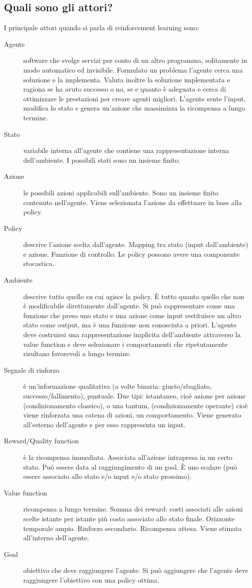 \documentclass[\main/main.tex]{subfiles}
\begin{document}
\subsection{Quali sono gli attori?}
I principale attori quando si parla di reinforcement learning sono:
\begin{description}
  \item [Agente] software che svolge servizi per conto di un altro programma, solitamente in modo automatico ed invisibile. Formulato un problema l'agente cerca una soluzione e la implementa. Valuta inoltre la soluzione implementata e ragiona se ha avuto successo o no, se e quanto è adeguata e cerca di ottimizzare le prestazioni per creare agenti migliori. L'agente sente l'input, modifica lo stato e genera un'azione che massimizza la ricompensa a lungo termine.
  \item [Stato] variabile interna all'agente che contiene una rappresentazione interna dell'ambiente. I possibili stati sono un insieme finito.
  \item [Azione] le possibili azioni applicabili sull'ambiente. Sono un insieme finito contenuto nell'agente. Viene selezionata l'azione da effettuare in base alla policy.
  \item [Policy] descrive l'azione scelta dall'agente. Mapping tra stato (input dall'ambiente) e azione. Funzione di controllo. Le policy possono avere una componente stocastica.
  \item [Ambiente] descrive tutto quello su cui agisce la policy. È tutto quanto quello che non è modificabile direttamente dall'agente. Si può rappresentare come una funzione che preso uno stato e una azione come input restituisce un altro stato come output, ma è una funzione non conosciuta a priori. L'agente deve costruirsi una rappresentazione implicita dell'ambiente attraverso la value function e deve selezionare i comportamenti che ripetutamente risultano favorevoli a lungo termine.
  \item [Segnale di rinforzo] è un'informazione qualitativa (a volte binaria: giusto/sbagliato, successo/fallimento), puntuale. Due tipi: istantaneo, cioè azione per azione (condizionamento classico), o una tantum, (condizionamente operante) cioè viene rinforzata una catena di azioni, un comportamento. Viene generato all'esterno dell'agente e per esso rappresenta un input.
  \item [Reward/Quality function] è la ricompensa immediata. Associata all'azione intrapresa in un certo stato. Può essere data al raggiungimento di un goal. È uno scalare (può essere associato allo stato e/o input e/o stato prossimo).
  \item [Value function] ricompensa a lungo termine. Somma dei reward: costi associati alle azioni scelte istante per istante più costo associato allo stato finale. Orizzonte temporale ampio. Rinforzo secondario. Ricompensa attesa. Viene stimata all'interno dell'agente.
  \item [Goal] obiettivo che deve raggiungere l'agente. Si può aggiungere che l'agente deve raggiungere l'obiettivo con una policy ottima.
\end{description}
\end{document}
